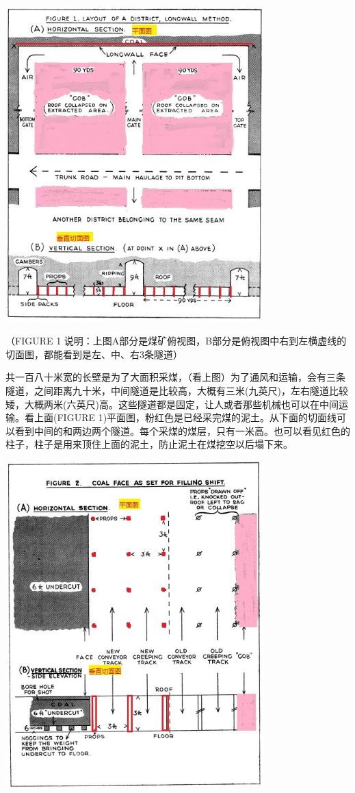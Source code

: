 \includegraphics[width=10cm]{langwall-修改56.jpg}

（FIGURE 1
说明：上图A部分是煤矿俯视图，B部分是俯视图中右到左横虚线的切面图，都能看到是左、中、右3条隧道）

共一百八十米宽的长壁是为了大面积采煤，（看上图）为了通风和运输，会有三条隧道，之间距离九十米，中间隧道是比较高，大概有三米(九英尺)，左右隧道比较矮，大概两米(六英尺)高。这些隧道都是固定，让人或者那些机械也可以在中间运输。看上面(FIGURE
1)平面图，粉红色是已经采完煤的泥土。从下面的切面线可以看到中间的和两边两个隧道。每个采煤的煤层，只有一米高。也可以看见红色的柱子，柱子是用来顶住上面的泥土，防止泥土在煤挖空以后塌下来。


\includegraphics[width=10cm]{langwall2-修改5.jpg}


